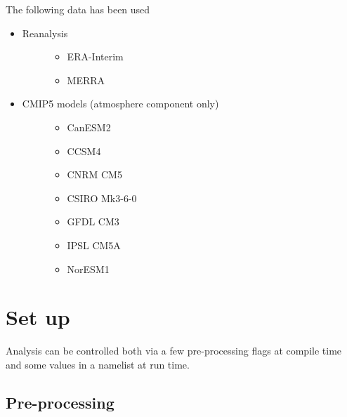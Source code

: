 \documentclass[a4paper]{article}
\begin{document}
The following data has been used
%
\begin{itemize}

\item %
\begin{description}
\item[{Reanalysis}] \leavevmode %
\begin{itemize}

\item ERA-Interim

\item MERRA

\end{itemize}

\end{description}

\item %
\begin{description}
\item[{CMIP5 models (atmosphere component only)}] \leavevmode %
\begin{itemize}

\item CanESM2

\item CCSM4

\item CNRM CM5

\item CSIRO Mk3-6-0

\item GFDL CM3

\item IPSL CM5A

\item NorESM1

\end{itemize}

\end{description}

\end{itemize}


\section{Set up%
  \label{set-up}%
}

Analysis can be controlled both via a few pre-processing flags at compile time and some values in a namelist at run time.


\subsection{Pre-processing%
  \label{pre-processing}%
}
\end{document}
